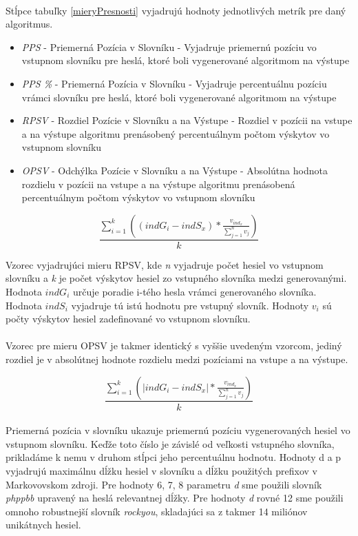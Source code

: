 \paragraph{}
Stĺpce tabuľky \ref{mieryPresnosti} vyjadrujú hodnoty jednotlivých metrík pre daný algoritmus.
\begin{itemize}
	\item \emph{PPS} - Priemerná Pozícia v Slovníku - Vyjadruje priemernú pozíciu vo vstupnom slovníku pre heslá, ktoré boli vygenerované algoritmom na výstupe
	\item \emph{PPS \%} - Priemerná Pozícia v Slovníku - Vyjadruje percentuálnu pozíciu vrámci slovníku pre heslá, ktoré boli vygenerované algoritmom na výstupe
	\item \emph{RPSV} - Rozdiel Pozície v Slovníku a na Výstupe - Rozdiel v pozícii na vstupe a na výstupe algoritmu prenásobený percentuálnym počtom výskytov vo vstupnom slovníku
    \item \emph{OPSV} - Odchýlka Pozície v Slovníku a na Výstupe - Absolútna hodnota rozdielu v pozícii na vstupe a na výstupe algoritmu prenásobená percentuálnym počtom výskytov vo vstupnom slovníku
\end{itemize}

\[ \frac{\displaystyle\sum_{i=1}^{k}((indG_i - indS_x) * \frac{v_{ind_x}}{\sum_{j=1}^{n}v_j})}{k} \]

Vzorec vyjadrujúci mieru RPSV, kde \emph{n} vyjadruje počet hesiel vo vstupnom slovníku a \emph{k} je počet výskytov hesiel zo vstupného slovníka medzi generovanými. Hodnota \emph{\(indG_i\)} určuje poradie i-tého hesla vrámci generovaného slovníka. Hodnota \emph{\(indS_i\)} vyjadruje tú istú hodnotu pre vstupný slovník. Hodnoty \emph{\(v_i\)} sú počty výskytov hesiel zadefinované vo vstupnom slovníku.

\paragraph{}
Vzorec pre mieru OPSV je takmer identický s vyššie uvedeným vzorcom, jediný rozdiel je v absolútnej hodnote rozdielu medzi pozíciami na vstupe a na výstupe.

\[ \frac{\displaystyle\sum_{i=1}^{k}(|indG_i - indS_x| * \frac{v_{ind_x}}{\sum_{j=1}^{n}v_j})}{k} \]

\paragraph{}
Priemerná pozícia v slovníku ukazuje priemernú pozíciu vygenerovaných hesiel vo vstupnom slovníku. Keďže toto číslo je závislé od veľkosti vstupného slovníka, prikladáme k nemu v druhom stĺpci jeho percentuálnu hodnotu. Hodnoty d a p vyjadrujú maximálnu dĺžku hesiel v slovníku a dĺžku použitých prefixov v Markovovskom zdroji. Pre hodnoty 6, 7, 8 parametru \emph{d} sme použili slovník \emph{phppbb} upravený na heslá relevantnej dĺžky. Pre hodnoty \emph{d} rovné 12 sme použili omnoho robustnejší slovník \emph{rockyou}, skladajúci sa z takmer 14 miliónov unikátnych hesiel.

